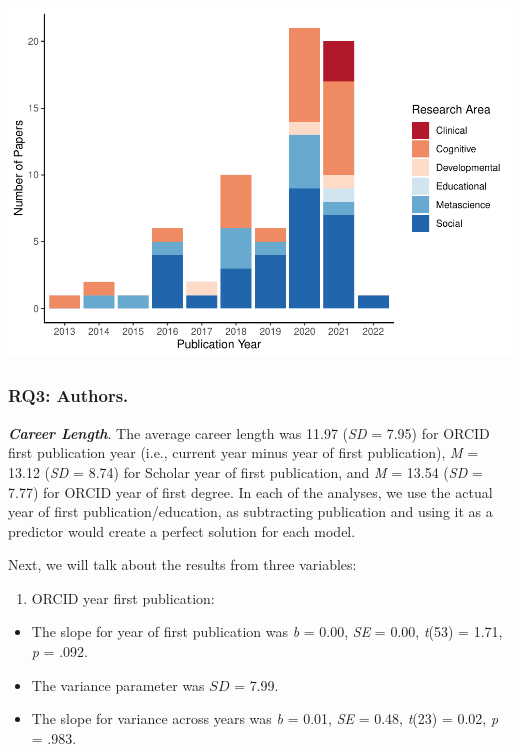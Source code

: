 \documentclass[
  english,
  man]{apa6}
\providecommand{\tightlist}{%
  \setlength{\itemsep}{0pt}\setlength{\parskip}{0pt}}
\begin{document}
\includegraphics{04.manuscript_files/figure-latex/figure1-1.pdf}

\hypertarget{rq3-authors.-1}{%
\subsubsection{\texorpdfstring{RQ3: Authors.\\
}{RQ3: Authors. }}\label{rq3-authors.-1}}

\textbf{\emph{Career Length}}. The average career length was 11.97 (\emph{SD} = 7.95) for ORCID first publication year (i.e., current year minus year of first publication), \emph{M} = 13.12 (\emph{SD} = 8.74) for Scholar year of first publication, and \emph{M} = 13.54 (\emph{SD} = 7.77) for ORCID year of first degree. In each of the analyses, we use the actual year of first publication/education, as subtracting publication and using it as a predictor would create a perfect solution for each model.

Next, we will talk about the results from three variables:

\begin{enumerate}
\def\labelenumi{\arabic{enumi})}
\tightlist
\item
  ORCID year first publication:
\end{enumerate}

\begin{itemize}
\tightlist
\item
  The slope for year of first publication was \emph{b} = 0.00, \emph{SE} = 0.00, \emph{t}(53) = 1.71, \emph{p} = .092.
\item
  The variance parameter was \(SD\) = 7.99.
\item
  The slope for variance across years was \emph{b} = 0.01, \emph{SE} = 0.48, \emph{t}(23) = 0.02, \emph{p} = .983.
\end{itemize}
\end{document}
